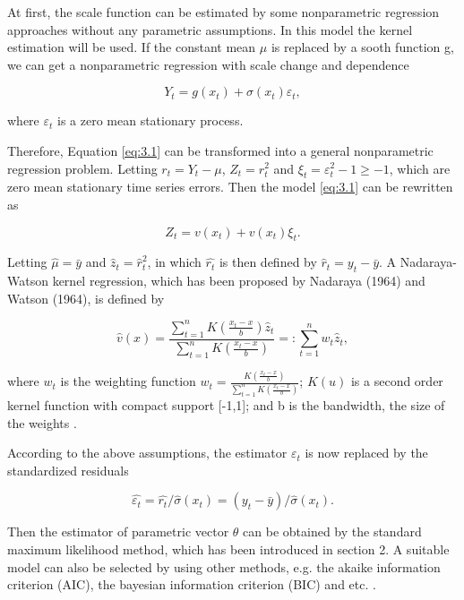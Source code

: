 At first, the scale function can be estimated by some nonparametric regression approaches without any parametric assumptions. In this model the kernel estimation will be used. If the constant mean $\mu$ is replaced by a sooth function g, we can get a nonparametric regression with scale change and dependence

\begin{equation}
\label{equ3.5}
Y_t= g(x_t)+\sigma(x_t)\varepsilon_t,
\end{equation}

where ${\varepsilon_t}$ is a zero mean stationary process.


Therefore, Equation \ref{eq:3.1} can be transformed into a general nonparametric regression problem. Letting $ r_{t}=Y_{t}-\mu$, $Z_{t}=r_{t}^{2}$ and $\xi_{t}=\varepsilon_{t}^{2}-1 \geq -1$, which are zero mean stationary time series errors. Then the model \ref{eq:3.1} can be rewritten as 

\begin{equation}
\label{equ3.4}
 Z_{t} = v(x_{t} )+ v(x_{t})\xi_{t}.
\end{equation}


Letting $\hat{\mu }=\bar{y}$ and $\hat{z}_{t} = \hat{r}_{t}^{2}$, in which $\hat{r_{t}}$ is then defined by $\hat{r}_{t}=y_{t}-\bar{y}$. A Nadaraya-Watson kernel regression, which has been proposed by Nadaraya (1964) and Watson (1964), is defined by

\begin{equation}
\hat{v}(x)=\frac{\sum_{t=1}^{n}K(\frac{x_t-x}{b})\hat{z}_t}{\sum_{t=1}^{n}K(\frac{x_t-x}{b})}=:\sum_{t=1}^nw_t\hat{z}_t,
\end{equation}

where $w_t$ is the weighting function $w_t= \frac{K(\frac{x_t-x}{b})}{\sum_{t=1}^{n}K(\frac{x_t-x}{b})} $; $K(u)$ is a second order kernel function with compact support [-1,1]; and b is the bandwidth, the size of the weights \citep{Fan1993}. 

According to the above assumptions, the estimator $\varepsilon_{t}$ is now replaced by the standardized residuals

\begin{equation}
\hat{\varepsilon_t }=\hat{r_t}/\hat{\sigma }(x_t)=(y_t-\bar{y})/\hat{\sigma}(x_t). 
\end{equation}

Then the estimator of parametric vector $\theta$ can be obtained by the standard maximum likelihood method, which has been introduced in section 2. A suitable model can also be selected by using other methods, e.g. the akaike information criterion (AIC), the bayesian information criterion (BIC) and etc. \citep{Feng2004}.



